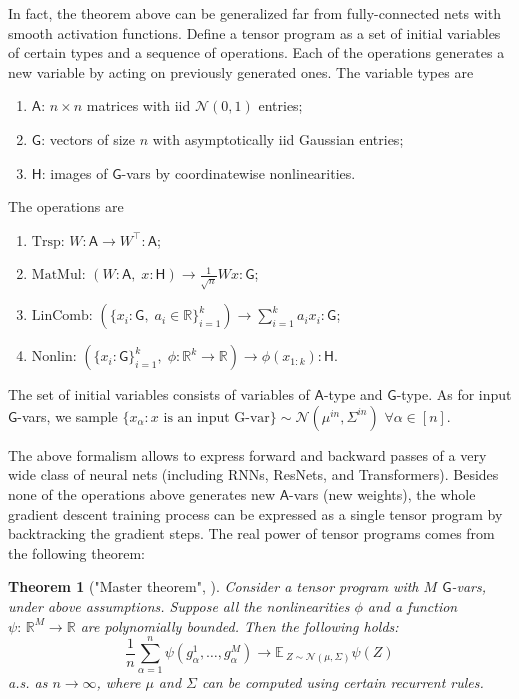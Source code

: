 \documentclass{article}
\newcommand{\Atype}{\mathsf{A}}
\newcommand{\Gtype}{\mathsf{G}}
\newcommand{\Htype}{\mathsf{H}}
\newcommand{\trspop}{\mathrm{Trsp}}
\newcommand{\matmul}{\mathrm{MatMul}}
\newcommand{\lincomb}{\mathrm{LinComb}}
\newcommand{\nonlin}{\mathrm{Nonlin}}
\newcommand{\trsp}{\top}
\newcommand{\EE}{\mathbb{E}\,}
\newcommand{\RR}{\mathbb{R}}
\newcommand{\NN}{\mathcal{N}}
\newtheorem{theorem}{Theorem}
\begin{document}
    In fact, the theorem above can be generalized far from fully-connected nets with smooth activation functions.
    Define a tensor program as a set of initial variables of certain types and a sequence of operations.
    Each of the operations generates a new variable by acting on previously generated ones.
    The variable types are
    \begin{enumerate}
        \item $\Atype$: $n \times n$ matrices with iid $\NN(0,1)$ entries;
        \item $\Gtype$: vectors of size $n$ with asymptotically iid Gaussian entries;
        \item $\Htype$: images of $\Gtype$-vars by coordinatewise nonlinearities.
    \end{enumerate}
    The operations are
    \begin{enumerate}
        \item $\trspop$: $W: \Atype \to W^\trsp: \Atype$;
        \item $\matmul$: $(W: \Atype, \; x: \Htype) \to \frac{1}{\sqrt{n}} W x: \Gtype$; %
        \item {$\lincomb$: $(\{x_i: \Gtype, \; a_i \in \RR\}_{i=1}^k) \to \sum_{i=1}^k a_i x_i: \Gtype$;} %
        \item $\nonlin$: $(\{x_i: \Gtype\}_{i=1}^k, \; \phi: \RR^k \to \RR) \to \phi(x_{1:k}): \Htype$. %
    \end{enumerate}
    The set of initial variables consists of variables of $\Atype$-type and $\Gtype$-type.
    As for input $\Gtype$-vars, we sample $\{x_\alpha: \text{$x$ is an input G-var}\} \sim \NN(\mu^{in}, \Sigma^{in})$ $\forall \alpha \in [n]$.

    The above formalism allows to express forward and backward passes of a very wide class of neural nets (including RNNs, ResNets, and Transformers).
    Besides none of the operations above generates new $\Atype$-vars (new weights), the whole gradient descent training process can be expressed as a single tensor program by backtracking the gradient steps.
    The real power of tensor programs comes from the following theorem:
    \begin{theorem}["Master theorem", \cite{yang2020tensor_iii}]
        \label{thm:master_theorem}
        Consider a tensor program with $M$ $\Gtype$-vars, under above assumptions.
        Suppose all the nonlinearities $\phi$ and a function $\psi: \, \RR^M \to \RR$ are polynomially bounded.
        Then the following holds:
        \begin{equation}
            \frac{1}{n} \sum_{\alpha=1}^n \psi(g^1_\alpha,\ldots,g^M_\alpha)
            \to \EE_{Z \sim \NN(\mu,\Sigma)} \psi(Z)
        \end{equation}
        a.s. as $n \to \infty$, where $\mu$ and $\Sigma$ can be computed using certain recurrent rules.
    \end{theorem}
\end{document}
